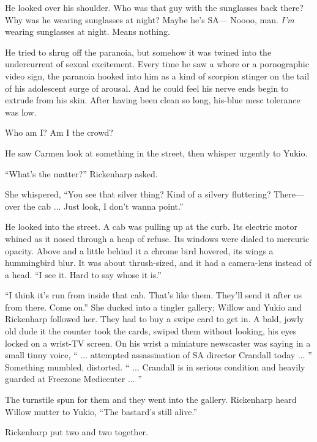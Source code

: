 He looked over his shoulder. Who was that guy with the sunglasses back there? Why was he wearing sunglasses at night? Maybe he's SA--- Noooo, man. \textit{I'm} wearing sunglasses at night. Means nothing.

He tried to shrug off the paranoia, but somehow it was twined into the undercurrent of sexual excitement. Every time he saw a whore or a pornographic video sign, the paranoia hooked into him as a kind of scorpion stinger on the tail of his adolescent surge of arousal. And he could feel his nerve ends begin to extrude from his skin. After having been clean so long, his-blue mesc tolerance was low.

Who am I? Am I the crowd?

He saw Carmen look at something in the street, then whisper urgently to Yukio.

``What's the matter?'' Rickenharp asked.

She whispered, ``You see that silver thing? Kind of a silvery fluttering? There---over the cab ... Just look, I don't wanna point.''

He looked into the street. A cab was pulling up at the curb. Its electric motor whined as it nosed through a heap of refuse. Its windows were dialed to mercuric opacity. Above and a little behind it a chrome bird hovered, its wings a hummingbird blur. It was about thrush-sized, and it had a camera-lens instead of a head. ``I see it. Hard to say whose it is.''

``I think it's run from inside that cab. That's like them. They'll send it after us from there. Come on.'' She ducked into a tingler gallery; Willow and Yukio and Rickenharp followed her. They had to buy a swipe card to get in. A bald, jowly old dude it the counter took the cards, swiped them without looking, his eyes locked on a wrist-TV screen. On his wrist a miniature newscaster was saying in a small tinny voice, `` ... attempted assassination of SA director Crandall today ... '' Something mumbled, distorted. `` ... Crandall is in serious condition and heavily guarded at Freezone Medicenter ... ''

The turnstile spun for them and they went into the gallery. Rickenharp heard Willow mutter to Yukio, ``The bastard's still alive.''

Rickenharp put two and two together.

